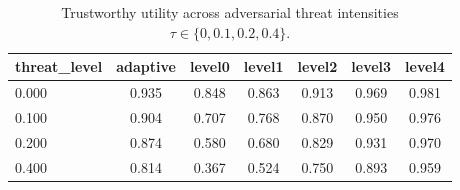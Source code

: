\begin{table}
\centering
\small
\caption{Trustworthy utility across adversarial threat intensities $\tau \in \{0, 0.1, 0.2, 0.4\}$.}
\label{tab:p4-attack}
\begin{tabular}{lcccccc}
\toprule
threat\_level & adaptive & level0 & level1 & level2 & level3 & level4 \\
\midrule
0.000 & 0.935 & 0.848 & 0.863 & 0.913 & 0.969 & 0.981 \\
0.100 & 0.904 & 0.707 & 0.768 & 0.870 & 0.950 & 0.976 \\
0.200 & 0.874 & 0.580 & 0.680 & 0.829 & 0.931 & 0.970 \\
0.400 & 0.814 & 0.367 & 0.524 & 0.750 & 0.893 & 0.959 \\
\bottomrule
\end{tabular}
\end{table}
